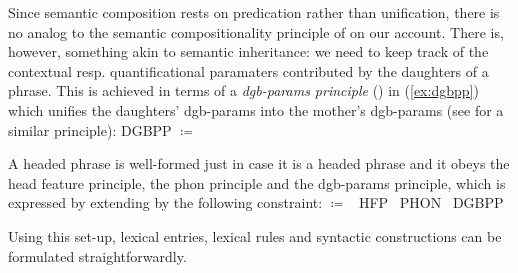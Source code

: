 \documentclass[output=paper]{langsci/langscibook}
\begin{document}
{Since  semantic composition rests on predication rather than unification, there is no analog to the semantic compositionality principle of \citet{Sag:Wasow:Bender:2003} on our account.
%
There is, however, something akin to semantic inheritance: we need to keep track of the contextual resp. quantificational paramaters contributed by the daughters of a phrase. 
%
This is achieved in terms of a \emph{dgb-params principle} () in (\ref{ex:dgbpp}) which unifies the daughters' dgb-params into the mother's dgb-params  (see \citet[126 \textit{et seq.}]{Ginzburg:2012}  for a similar principle): 
%
\ea \label{ex:dgbpp}
DGBPP $\coloneqq$ \label{ex:QPP} \par\medskip
{}
\z

A headed phrase is well-formed just in case it is a headed phrase and it obeys the head feature principle, the phon principle and the dgb-params principle, which is expressed by extending  by the following constraint:
%
\ea \label{ex:hd-phrase}
 $\coloneqq$ 
 \ttrmerge\ {HFP} \ttrmerge\  {PHON} \ttrmerge\ {DGBPP}
\z


Using this set-up, lexical entries, lexical rules and syntactic constructions can be formulated straightforwardly. 




\printbibliography[heading=subbibliography,notkeyword=this]
 

}%
\end{document}
